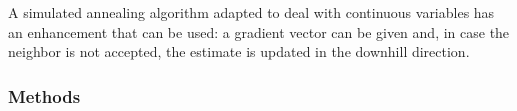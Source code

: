 A simulated annealing algorithm adapted to deal with continuous variables
has an enhancement that can be used: a gradient vector can be given and, in
case the neighbor is not accepted, the estimate is updated in the downhill
direction.


  \subsubsection{Methods}

    \vspace{0.5ex}

